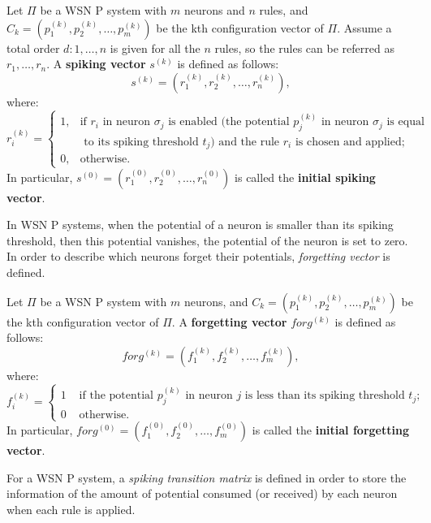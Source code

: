 \documentclass[runningheads]{llncs}
\begin{document}
\begin{definition}\label{SV-WTSNP}
Let $\Pi$ be a WSN P system with $m$ neurons and $n$ rules, and
$C_{k} = (p_{1}^{(k)}, p_{2}^{(k)}, \ldots , p_{m}^{(k)})$ be the
kth configuration vector of $\Pi$. Assume a total order
$d:1,\dots,n$ is given for all the $n$ rules, so the rules can be
referred as $r_1,\dots, r_n$. A {\bf spiking vector} $s^{(k)}$ is
defined as follows:
$$s^{(k)} = (r_1^{(k)}, r_2^{(k)}, \ldots , r_n^{(k)}),$$
where:
$$
r_{i}^{(k)}= \left\{ \begin{array}{rl}
 1, &\mbox{if $r_i$ in neuron $\sigma_j$ is enabled (the potential $p_j^{(k)}$ in neuron $\sigma_j$ is equal} \\
  & \mbox { to its spiking threshold $t_j$) and the rule $r_i$ is chosen and applied};\\
 0, &\mbox{otherwise}.
       \end{array} \right.
$$
In particular, $s^{(0)} = (r_1^{(0)}, r_2^{(0)}, \ldots ,
r_n^{(0)})$ is called the {\bf initial spiking vector}.
\end{definition}

In WSN P systems, when the potential of a neuron is smaller than its
spiking threshold, then this potential vanishes, the potential of
the neuron is set to zero. In order to describe which neurons forget
their potentials, \emph{forgetting vector} is defined.

\begin{definition}
Let $\Pi$ be a WSN P system with $m$ neurons, and $C_{k} =
(p_{1}^{(k)}, p_{2}^{(k)}, \ldots , p_{m}^{(k)})$ be the kth
configuration vector of $\Pi$. A {\bf forgetting vector}
$forg^{(k)}$ is defined as follows:
$$forg^{(k)} = (f_1^{(k)}, f_2^{(k)}, \ldots , f_m^{(k)}),$$
where:
$$
f_{i}^{(k)}= \left\{ \begin{array}{rl}
 1 &\mbox{ if the potential $p_j^{(k)}$ in neuron $j$ is less than its spiking threshold $t_j$;} \\
 0 &\mbox{ otherwise.}
       \end{array} \right.
$$
In particular, $forg^{(0)} = (f_1^{(0)}, f_2^{(0)}, \ldots ,
f_m^{(0)})$ is called the {\bf initial forgetting vector}.

\end{definition}

For a WSN P system, a \emph{spiking transition matrix} is defined in
order to store the information of the amount of potential consumed
(or received) by each neuron when each rule is applied.
\end{document}
